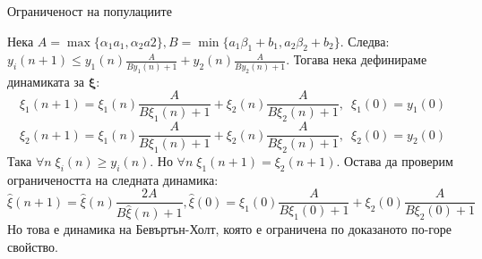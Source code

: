 \begin{frame}[t]{Ограниченост на популациите}

  Нека $A=\max \{\alpha_{1} a_{1},\alpha_{2} a{2}\}, B=\min \{a_{1} \beta_{1} + b_{1},a_{2} \beta_{2} + b_{2}\}$. Следва:
  $y_{i}(n+1) \leq y_{1}(n) \frac{A}{B y_{1}(n) + 1} + y_{2}(n) \frac{A}{B y_{2}(n) + 1}$. Тогава нека дефинираме динамиката за $\boldsymbol{\xi}$:
  \[\xi_{1}(n+1) = \xi_{1}(n) \frac{A}{B \xi_{1}(n) + 1} + \xi_{2}(n) \frac{A}{B \xi_{2}(n) + 1}, \enspace \xi_{1}(0)=y_{1}(0)\]
  \[\xi_{2}(n+1) = \xi_{1}(n) \frac{A}{B \xi_{1}(n) + 1} + \xi_{2}(n) \frac{A}{B \xi_{2}(n) + 1}, \enspace \xi_{2}(0)=y_{2}(0)\]
  Така $\forall{n} \; \xi_{i}(n) \geq y_{i}(n)$. Но $\forall{n} \; \xi_{1}(n+1)=\xi_{2}(n+1)$. Остава да проверим ограничеността на следната динамика:
  \[\hat{\xi}(n+1) = \hat{\xi}(n) \frac{2 A}{B \hat{\xi}(n) + 1}, \hat{\xi}(0)=\xi_{1}(0) \frac{A}{B \xi_{1}(0) + 1} + \xi_{2}(0) \frac{A}{B \xi_{2}(0) + 1}\]
  Но това е динамика на Бевъртън-Холт, която е ограничена по доказаното по-горе свойство.

\end{frame}
